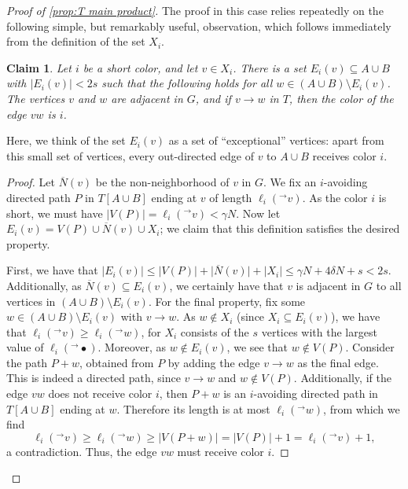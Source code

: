\documentclass[10pt,a4paper]{amsart}
\newtheorem{claim}{Claim}
\newcommand\ab[1]{\lvert#1\rvert}
\newcommand\ol[1]{\overline{#1}}
\begin{document}
\begin{proof}[Proof of \cref{prop:T main product}]
    The proof in this case relies repeatedly on the following simple, but remarkably useful, observation, which follows immediately from the definition of the set $X_i$. 
    \begin{claim}\label{claim:exceptional}
        Let $i$ be a short color, and let $v \in X_i$. There is a set $E_i(v) \subseteq A \cup B$ with $\ab{E_i(v)}< 2s$ such that the following holds for all $w \in (A \cup B) \setminus  E_i(v)$. The vertices $v$ and $w$ are adjacent in $G$, and if $v\to w$ in $T$, then the color of the edge $vw$ is $i$.
    \end{claim}
    Here, we think of the set $E_i(v)$ as a set of ``exceptional'' vertices: apart from this small set of vertices, every out-directed edge of $v$ to $A \cup B$ receives color $i$. 
    \begin{proof}
        Let $\ol N(v)$ be the non-neighborhood of $v$ in $G$.
        We fix an $i$-avoiding directed path $P$ in $T[A\cup B]$ ending at $v$ of length $\ell_i(^\to v)$. As the color $i$ is short, we must have $\ab{V(P)}=\ell_i(^\to v)<\gamma N$. Now let $E_i(v)=V(P) \cup \ol N(v) \cup X_i$; we claim that this definition satisfies the desired property. 

        First, we have that $\ab{E_i(v)}\leq \ab{V(P)}+\ab{\ol N(v)}+\ab{X_i} \leq \gamma N+4\delta N+s < 2s$. Additionally, as $\ol N(v)\subseteq E_i(v)$, we certainly have that $v$ is adjacent in $G$ to all vertices in $(A\cup B) \setminus E_i(v)$. For the final property, fix some $w \in (A\cup B) \setminus E_i(v)$ with $v\to w$. As $w \notin X_i$ (since $X_i \subseteq E_i(v)$), we have that
        $\ell_i(^\to v) \geq \ell_i(^\to w)$, for $X_i$ consists of the $s$ vertices with the largest value of $\ell_i(^\to \bullet)$. Moreover, as $w \notin E_i(v)$, we see that $w \notin V(P)$. Consider the path $P +w$, obtained from $P$ by adding the edge $v\to w$ as the final edge. This is indeed a directed path, since $v\to w$ and $w \notin V(P)$. Additionally, if the edge $vw$ does not receive color $i$, then $P+w$ is an $i$-avoiding directed path in $T[A \cup B]$ ending at $w$. Therefore its length is at most $\ell_i(^\to w)$, from which we find
        \[
            \ell_i(^\to v) \geq \ell_i(^\to w) \geq \ab{V(P+w)} = \ab{V(P)}+1 = \ell_i(^\to v)+1,
        \]
        a contradiction. Thus, the edge $vw$ must receive color $i$. 
    \end{proof}


\end{proof}
\end{document}
